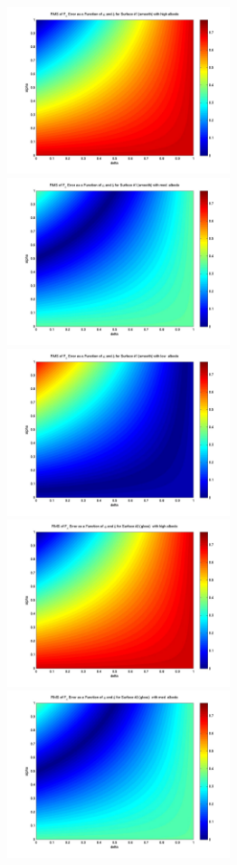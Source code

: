 \begin{description}
  \begin{figure}[!ht]
  \leftskip=-20mm
  \begin{minipage}[t]{200mm}\centering
    \includegraphics[width=65mm]{figs/sda/F_x_error_albedo_high_surf_smooth.jpg}
    \includegraphics[width=65mm]{figs/sda/F_x_error_albedo__med_surf_smooth.jpg}
    \includegraphics[width=65mm]{figs/sda/F_x_error_albedo__low_surf_smooth.jpg}
    \includegraphics[width=65mm]{figs/sda/F_x_error_albedo_high_surf__gloss.jpg}
    \includegraphics[width=65mm]{figs/sda/F_x_error_albedo__med_surf__gloss.jpg}

\end{minipage}
\end{figure}
\end{description}
